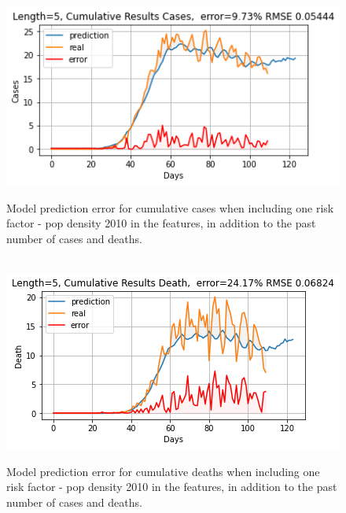 \documentclass[12pt]{article}
\theoremstyle{definition}
\renewcommand{\_}{%
    \textunderscore\hspace{0pt}%
}
\begin{document}
\begin{figure}[!p]
    \begin{minipage}{.45\textwidth}
    \centering
    \includegraphics[width=1.0\textwidth]{images/predict/Length_5-fields_pop_density_2010-Cumulative-Cases.png}
    \vspace{-1cm}
    \caption{Model prediction error for cumulative cases when including one risk factor - pop\_density\_2010 in the features, in addition to the past number of cases and deaths.}
    \label{fig:error-case-popdensity}
    \end{minipage}
    \begin{minipage}{.45\textwidth}
    \ \
    \centering
    \includegraphics[width=1.0\textwidth]{images/predict/Length_5-fields_pop_density_2010-Cumulative-Death.png}
    \vspace{-1cm}
    \caption{Model prediction error for cumulative deaths when including one risk factor - pop\_density\_2010 in the features, in addition to the past number of cases and deaths.}
    \label{fig:error-death-popdensity}
    \end{minipage}
\end{figure}
\end{document}
